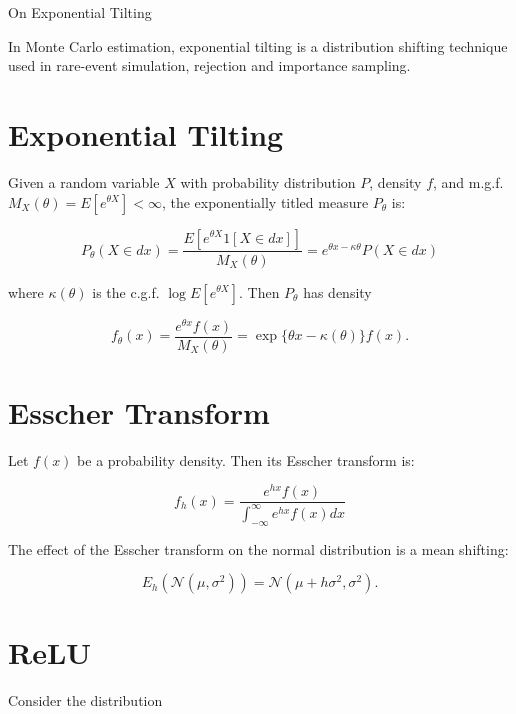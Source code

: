 \documentclass[11pt]{article}
\begin{document}
\begin{center}
{\huge On Exponential Tilting} 
\end{center}

In Monte Carlo estimation, exponential tilting is a distribution shifting technique used in rare-event simulation, rejection and importance sampling.

\section{Exponential Tilting}

Given a random variable $X$ with probability distribution $P$, density $f$, and m.g.f. $M_X(\theta) = E[e^{\theta X}] < \infty$, the exponentially titled measure $P_\theta$ is:

\begin{equation}
P_\theta(X \in dx) = \frac{E[e^{\theta X}1[X\in dx]]}{M_X (\theta)} = e^{\theta x - \kappa{\theta}} P(X \in dx)
\end{equation}

where $\kappa(\theta)$ is the c.g.f. $\log E[e^{\theta X}]$. Then $P_\theta$ has density

\begin{equation}
f_\theta(x) = \frac{e^{\theta x}f(x)}{M_X(\theta)}=\exp\{\theta x - \kappa(\theta) \}f(x).
\end{equation}

\section{Esscher Transform}

Let $f(x)$ be a probability density. Then its Esscher transform is:

\begin{equation}
f_h(x) = \frac{ e^{hx}f(x) }{ \int_{-\infty}^{\infty} e^{hx}f(x)dx }
\end{equation}

The effect of the Esscher transform on the normal distribution is a mean shifting:

\begin{equation}
E_h(\mathcal{N}(\mu,\sigma^2)) = \mathcal{N}(\mu+h\sigma^2,\sigma^2).
\end{equation}

\section{ReLU}

Consider the distribution
\end{document}
